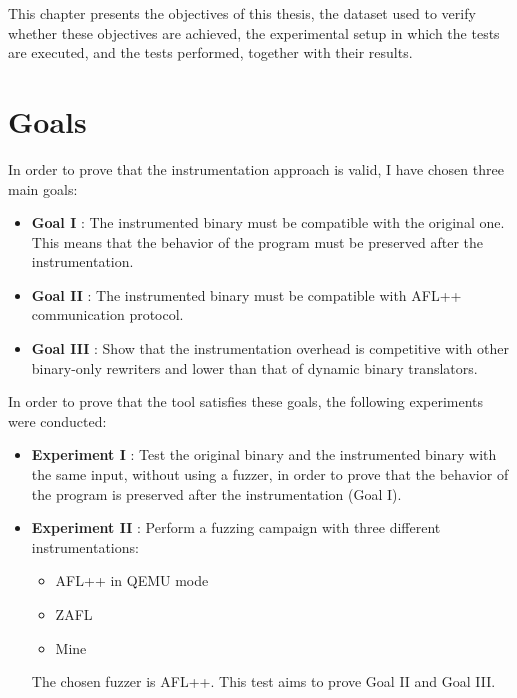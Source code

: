This chapter presents the objectives of this thesis, the dataset used to verify whether these objectives are achieved, 
the experimental setup in which the tests are executed, and the tests performed, together with their results.

\section{Goals} \label{sec:goals}
    In order to prove that the instrumentation approach is valid, I have chosen three main goals:
    \begin{itemize}
        \item \textbf{Goal I} : The instrumented binary must be compatible with the original one.
            This means that the behavior of the program must be preserved after the instrumentation.
        \item \textbf{Goal II} : The instrumented binary must be compatible with AFL++ communication protocol.
        \item \textbf{Goal III} : Show that the instrumentation overhead is competitive with other binary-only rewriters 
                and lower than that of dynamic binary translators.
    \end{itemize}

    In order to prove that the tool satisfies these goals, the following experiments were conducted:
    \begin{itemize}
        \item \textbf{Experiment I} : Test the original binary and the instrumented binary with the same input, 
            without using a fuzzer, in order to prove that the behavior of the program is preserved after the instrumentation 
            (Goal I).
        \item \textbf{Experiment II} : Perform a fuzzing campaign with three different instrumentations:
        \begin{itemize}
            \item AFL++ in QEMU mode
            \item ZAFL 
            \item Mine
        \end{itemize}
        The chosen fuzzer is AFL++. This test aims to prove Goal II and Goal III.
    \end{itemize}

